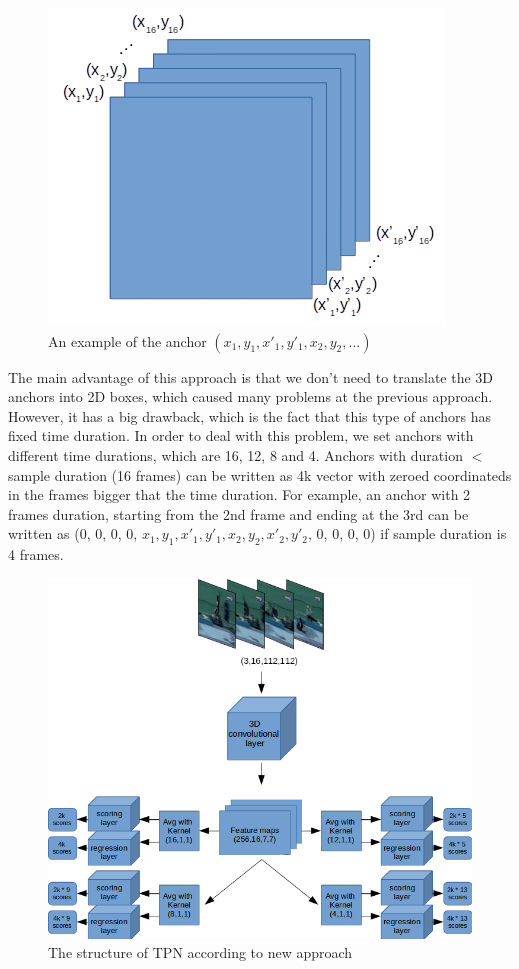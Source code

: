 \documentclass{report}
\begin{document}
\begin{figure}[h]
  \centering
  \includegraphics[scale=0.5]{anchor_4k}
  \caption{An example of the anchor $(x_1,y_1,x'_1,y'_1,x_2,y_2, ...)$}
  \label{fig:anchor_4k}
\end{figure}

The main advantage of this approach is that we don't need to translate the 3D anchors into 2D boxes, which caused many problems at the previous approach.
However, it has a big drawback, which is the fact that this type of anchors has fixed time duration.
In order to deal with this problem, we set anchors with different time durations, which are 16, 12, 8 and 4.
Anchors with duration $ < $ sample duration (16 frames) can be written as 4k vector with zeroed coordinateds in the frames bigger that the time duration. For example, an anchor with
2 frames duration, starting from the 2nd frame and ending at the 3rd can be written as (0, 0, 0, 0, $x_1, y_1, x'_1, y'_1, x_2, y_2, x'_2, y'_2$, 0, 0, 0, 0) if sample
duration is 4 frames. 

\begin{figure}[h]
  \centering
  \includegraphics[scale=0.4]{tpn_2}
  \caption{The structure of TPN according to new approach}
  \label{fig:New_structure}
\end{figure}
\end{document}
